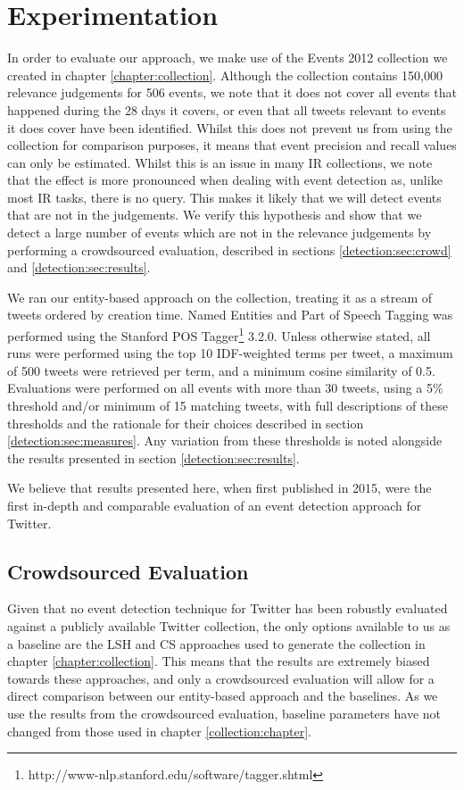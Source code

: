 
\section{Experimentation}
\label{detection:sec:experimentation}
In order to evaluate our approach, we make use of the Events 2012 collection we created in chapter \ref{chapter:collection}.
Although the collection contains 150,000 relevance judgements for 506 events, we note that it does not cover all events that happened during the 28 days it covers, or even that all tweets relevant to events it does cover have been identified.
Whilst this does not prevent us from using the collection for comparison purposes, it means that event precision and recall values can only be estimated.
Whilst this is an issue in many IR collections, we note that the effect is more pronounced when dealing with event detection as, unlike most IR tasks, there is no query.
This makes it likely that we will detect events that are not in the judgements.
We verify this hypothesis and show that we detect a large number of events which are not in the relevance judgements by performing a crowdsourced evaluation, described in sections \ref{detection:sec:crowd} and \ref{detection:sec:results}.

We ran our entity-based approach on the collection, treating it as a stream of tweets ordered by creation time.
Named Entities and Part of Speech Tagging was performed using the Stanford POS Tagger\footnote{http://www-nlp.stanford.edu/software/tagger.shtml} 3.2.0.
Unless otherwise stated, all runs were performed using the top 10 IDF-weighted terms per tweet, a maximum of 500 tweets were retrieved per term, and a minimum cosine similarity of 0.5.
Evaluations were performed on all events with more than 30 tweets, using a 5\% threshold and/or minimum of 15 matching tweets, with full descriptions of these thresholds and the rationale for their choices described in section \ref{detection:sec:measures}.
Any variation from these thresholds is noted alongside the results presented in section \ref{detection:sec:results}.

We believe that results presented here, when first published in 2015, were the first in-depth and comparable evaluation of an event detection approach for Twitter.

\subsection{Crowdsourced Evaluation}
\label{sec:baseline}
Given that no event detection technique for Twitter has been robustly evaluated against a publicly available Twitter collection, the only options available to us as a baseline are the LSH \citep{Petrovic10} and CS \citep{Aggarwal12} approaches used to generate the collection in chapter \ref{chapter:collection}.
This means that the results are extremely biased towards these approaches, and only a crowdsourced evaluation will allow for a direct comparison between our entity-based approach and the baselines.
As we use the results from the crowdsourced evaluation, baseline parameters have not changed from those used in chapter \ref{collection:chapter}.

